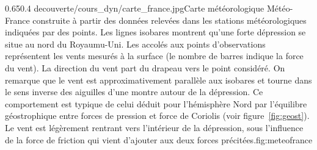 \figside
{0.65}{0.4}
{decouverte/cours_dyn/carte_france.jpg}{Carte météorologique Météo-France construite à partir des données relevées dans les stations météorologiques indiquées par des points. Les lignes isobares montrent qu'une forte dépression se situe au nord du Royaumu-Uni. Les  accolés aux points d'observations représentent les vents mesurés à la surface (le nombre de barres indique la force du vent). La direction du vent part du drapeau vers le point considéré. On remarque que le vent est approximativement parallèle aux isobares et tourne dans le sens inverse des aiguilles d'une montre autour de la dépression. Ce comportement est typique de celui déduit pour l'hémisphère Nord par l'équilibre géostrophique entre forces de pression et force de Coriolis (voir figure~\ref{fig:geost}). Le vent est légèrement rentrant vers l'intérieur de la dépression, sous l'influence de la force de friction qui vient d'ajouter aux deux forces précitées.}{fig:meteofrance}


